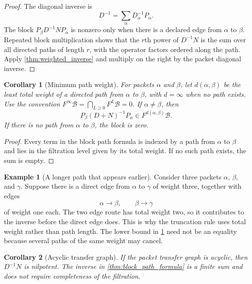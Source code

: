 \documentclass[11pt,a4paper]{article}
\newtheorem{corollary}[corollary]{Corollary}
\theoremstyle{definition}
\newtheorem{example}[example]{Example}
\theoremstyle{remark}
\newcommand{\Bcal}{\mathcal B}
\theoremstyle{definition}\newtheorem{construction}[theorem]{Construction}\newtheorem{certificate}[theorem]{Numerical Certificate}
\theoremstyle{remark}\newtheorem{boundary}[theorem]{Boundary}
\begin{document}
\begin{proof}
The diagonal inverse is
\[
D^{-1}=\sum_\alpha D_\alpha^{-1}P_\alpha.
\]
The block $P_\beta D^{-1}NP_\alpha$ is nonzero only when there is a declared edge from $\alpha$ to $\beta$.  Repeated block multiplication shows that the $r$th power of $D^{-1}N$ is the sum over all directed paths of length $r$, with the operator factors ordered along the path.  Apply \cref{thm:weighted_inverse} and multiply on the right by the packet diagonal inverse.
\end{proof}

\begin{corollary}[Minimum path weight]\label{cor:minimum_path_weight}
For packets $\alpha$ and $\beta$, let $d(\alpha,\beta)$ be the least total weight of a directed path from $\alpha$ to $\beta$, with $d=\infty$ when no path exists.  Use the convention $F^\infty\Bcal=\bigcap_{L\geq0}F^L\Bcal=0$.  If $\alpha\ne\beta$, then
\[
P_\beta(D+N)^{-1}P_\alpha
\in
F^{d(\alpha,\beta)}\Bcal.
\]
If there is no path from $\alpha$ to $\beta$, the block is zero.
\end{corollary}

\begin{proof}
Every term in the block path formula is indexed by a path from $\alpha$ to $\beta$ and lies in the filtration level given by its total weight.  If no such path exists, the sum is empty.
\end{proof}

\begin{example}[A longer path that appears earlier]\label{ex:weighted_route}
Consider three packets $\alpha$, $\beta$, and $\gamma$.  Suppose there is a direct edge from $\alpha$ to $\gamma$ of weight three, together with edges
\[
\alpha\longrightarrow\beta,
\qquad
\beta\longrightarrow\gamma
\]
of weight one each.  The two edge route has total weight two, so it contributes to the inverse before the direct edge does.  This is why the truncation rule uses total weight rather than path length.  The lower bound in \cref{cor:minimum_path_weight} need not be an equality because several paths of the same weight may cancel.
\end{example}

\begin{corollary}[Acyclic transfer graph]\label{cor:acyclic_inverse}
If the packet transfer graph is acyclic, then $D^{-1}N$ is nilpotent.  The inverse in \cref{thm:block_path_formula} is a finite sum and does not require completeness of the filtration.
\end{corollary}
\end{document}
